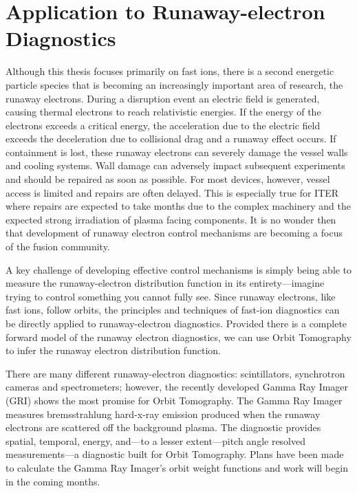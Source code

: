 \section{Application to Runaway-electron Diagnostics}
Although this thesis focuses primarily on fast ions, there is a second energetic particle species that is becoming an increasingly important area of research, the runaway electrons.
During a disruption event an electric field is generated, causing thermal electrons to reach relativistic energies.
If the energy of the electrons exceeds a critical energy, the acceleration due to the electric field exceeds the deceleration due to collisional drag and a runaway effect occurs.
If containment is lost, these runaway electrons can severely damage the vessel walls and cooling systems.
Wall damage can adversely impact subsequent experiments and should be repaired as soon as possible.
For most devices, however, vessel access is limited and repairs are often delayed.
This is especially true for ITER where repairs are expected to take months due to the complex machinery and the expected strong irradiation of plasma facing components.\cite{iter1999overview,ikeda2007progress,hender2007mhd,boozer2017runaway}
It is no wonder then that development of runaway electron control mechanisms are becoming a focus of the fusion community.
 
A key challenge of developing effective control mechanisms is simply being able to measure the runaway-electron distribution function in its entirety---imagine trying to control something you cannot fully see.
Since runaway electrons, like fast ions, follow orbits, the principles and techniques of fast-ion diagnostics can be directly applied to runaway-electron diagnostics. Provided there is a complete forward model of the runaway electron diagnostics, we can use Orbit Tomography to infer the runaway electron distribution function. 

There are many different runaway-electron diagnostics: scintillators, synchrotron cameras and spectrometers; however, the recently developed Gamma Ray Imager\cite{paz2017spatiotemporal} (GRI) shows the most promise for Orbit Tomography. The Gamma Ray Imager measures bremsstrahlung hard-x-ray emission produced when the runaway electrons are scattered off the background plasma.
The diagnostic provides spatial, temporal, energy, and---to a lesser extent---pitch angle resolved measurements---a diagnostic built for Orbit Tomography. Plans have been made to calculate the Gamma Ray Imager's orbit weight functions and work will begin in the coming months.
